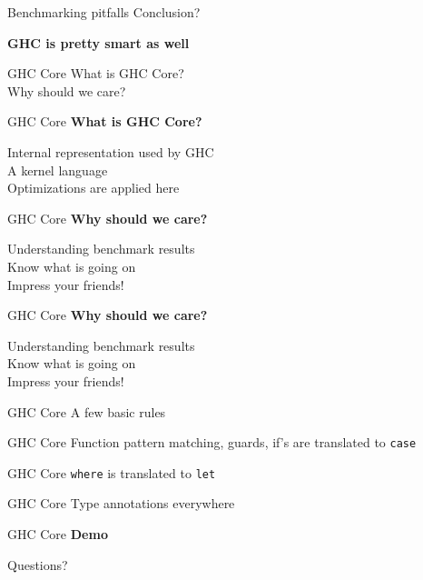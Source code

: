 \documentclass[20pt]{beamer}
\newcommand{\vspaced}{
    \vspace{5mm}
}
\begin{document}
\begin{frame}{Benchmarking pitfalls}
    Conclusion? \\
    \vspaced
    \textbf{GHC is pretty smart as well}
\end{frame}


\begin{frame}{GHC Core}
    What is GHC Core? \\
    Why should we care?
\end{frame}

\begin{frame}{GHC Core}
    \textbf{What is GHC Core?} \\
    \vspaced
    Internal representation used by GHC \\
    A kernel language \\
    Optimizations are applied here
\end{frame}

\begin{frame}{GHC Core}
    \textbf{Why should we care?} \\
    \vspaced
    Understanding benchmark results \\
    Know what is going on \\
    Impress your friends!
\end{frame}

\begin{frame}{GHC Core}
    \textbf{Why should we care?} \\
    \vspaced
    Understanding benchmark results \\
    Know what is going on \\
    Impress your friends!
\end{frame}

\begin{frame}{GHC Core}
    A few basic rules
\end{frame}

\begin{frame}{GHC Core}
    Function pattern matching, guards, if's are translated to \texttt{case}
\end{frame}

\begin{frame}{GHC Core}
    \texttt{where} is translated to \texttt{let}
\end{frame}

\begin{frame}{GHC Core}
    Type annotations everywhere
\end{frame}

\begin{frame}{GHC Core}
    \textbf{Demo}
\end{frame}

\begin{frame}[plain]
    \begin{center}
    \huge{Questions?}
    \end{center}
\end{frame}
\end{document}
